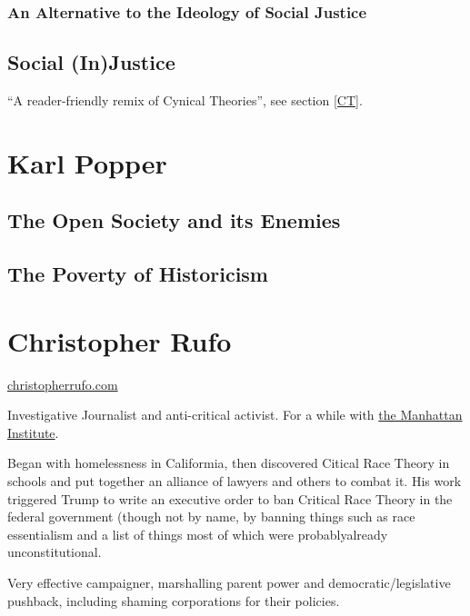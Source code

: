 \documentclass[10pt,titlepage]{book}
\begin{document}
\subsubsection{An Alternative to the Ideology of Social Justice}

\subsection{Social (In)Justice \cite{pluckrose-socinj}}\label{SI}

``A reader-friendly remix of Cynical Theories'', see section \ref{CT}.

\section{Karl Popper}\label{PopperKarl}

\subsection{The Open Society and its Enemies}

\cite{popperOSE1,popperOSE2}

\subsection{The Poverty of Historicism}

\cite{popperPOH}

\section{Christopher Rufo}\label{RufoChristopher}

\href{https://christopherrufo.com}{christopherrufo.com}

Investigative Journalist and anti-critical activist.
For a while with \href{manhattan-institute.org}{the Manhattan Institute}.

Began with homelessness in Califormia, then discovered Citical Race Theory in schools and put together an alliance of lawyers and others to combat it.
His work triggered Trump to write an executive order to ban Critical Race Theory in the federal government (though not by name, by banning things such as race essentialism and a list of things most of which were probablyalready unconstitutional.

Very effective campaigner, marshalling parent power and democratic/legislative pushback, including shaming corporations for their policies.
\end{document}
